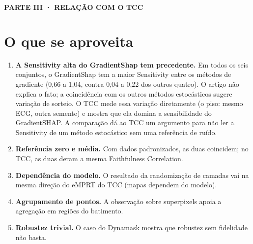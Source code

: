 \documentclass[11pt,a4paper]{article}
\newcommand{\partbar}[1]{\par\vspace{1.2em}\noindent\colorbox{black!80}{\parbox{\dimexpr\linewidth-2\fboxsep}{\color{white}\bfseries\sffamily\MakeUppercase{#1}}}\par\vspace{0.4em}}
\begin{document}
\partbar{Parte III · Relação com o TCC}

\section{O que se aproveita}
\begin{enumerate}
\item \textbf{A Sensitivity alta do GradientShap tem precedente.} Em todos os seis conjuntos, o GradientShap tem a maior Sensitivity entre os métodos de gradiente (0,66 a 1,04, contra 0,04 a 0,22 dos outros quatro). O artigo não explica o fato; a coincidência com os outros métodos estocásticos sugere variação de sorteio. O TCC mede essa variação diretamente (o piso: mesmo ECG, outra semente) e mostra que ela domina a sensibilidade do GradientSHAP. A comparação dá ao TCC um argumento para não ler a Sensitivity de um método estocástico sem uma referência de ruído.
\item \textbf{Referência zero e média.} Com dados padronizados, as duas coincidem; no TCC, as duas deram a mesma Faithfulness Correlation.
\item \textbf{Dependência do modelo.} O resultado da randomização de camadas vai na mesma direção do eMPRT do TCC (mapas dependem do modelo).
\item \textbf{Agrupamento de pontos.} A observação sobre superpixels apoia a agregação em regiões do batimento.
\item \textbf{Robustez trivial.} O caso do Dynamask mostra que robustez sem fidelidade não basta.
\end{enumerate}
\end{document}

